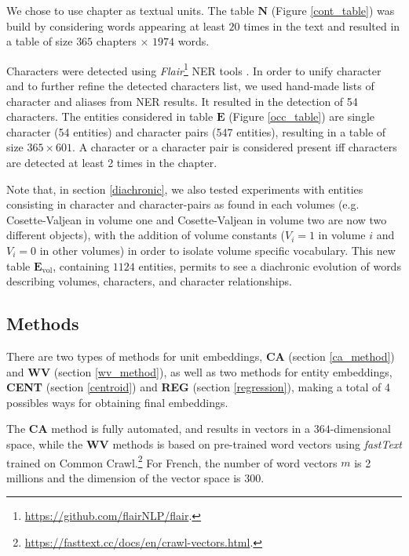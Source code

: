 \documentclass[
twocolumn,
]{ceurart}
\begin{document}
We chose to use chapter as textual units. The table $\mathbf{N}$ (Figure \ref{cont_table}) was build by considering words appearing at least $20$ times in the text and resulted in a table of size $365$ chapters $\times$ $1974$ words.

Characters were detected using \emph{Flair}\footnote{\url{https://github.com/flairNLP/flair}.} NER tools \cite{Akbik2018}. In order to unify character and to further refine the detected characters list, we used hand-made lists of character and aliases from NER results. It resulted in the detection of 54 characters. The entities considered in table $\mathbf{E}$ (Figure \ref{occ_table}) are single character (54 entities) and character pairs (547 entities), resulting in a table of size $365 \times 601$. A character or a character pair is considered present iff characters are detected at least 2 times in the chapter. 

Note that, in section \ref{diachronic}, we also tested experiments with entities consisting in character and character-pairs as found in each volumes (e.g. Cosette-Valjean in volume one and Cosette-Valjean in volume two are now two different objects), with the addition of volume constants ($V_i=1$ in volume $i$ and $V_i=0$ in other volumes) in order to isolate volume specific vocabulary. This new table $\mathbf{E}_\text{vol}$, containing $1124$ entities, permits to see a diachronic evolution of words describing volumes, characters, and character relationships. 

\subsection{Methods}

There are two types of methods for unit embeddings, \textbf{CA} (section \ref{ca_method}) and \textbf{WV} (section \ref{wv_method}), as well as two methods for entity embeddings, \textbf{CENT} (section \ref{centroid}) and \textbf{REG} (section \ref{regression}), making a total of 4 possibles ways for obtaining final embeddings. 

The \textbf{CA} method is fully automated, and results in vectors in a $364$-dimensional space, while the $\textbf{WV}$ methods is based on pre-trained word vectors using \emph{fastText} \cite{Bojanowski2017} trained on Common Crawl.\footnote{\url{ https://fasttext.cc/docs/en/crawl-vectors.html}.} For French, the number of word vectors $m$ is 2 millions and the dimension of the vector space is $300$. 
\end{document}
